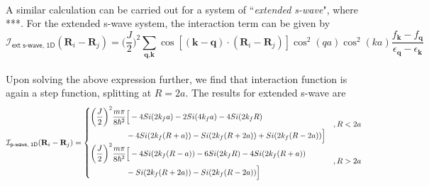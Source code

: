 \documentclass{article}
\begin{document}
\\
A similar calculation can be carried out for a system of ``\textit{extended s-wave}", where ***. For the extended s-wave system, the interaction term can be given by
\\
\begin{equation}
\mathcal{I}_{\textsf{ext s-wave, 1D}}(\textbf{R}_i - \textbf{R}_j)  =  \Bigg(\frac{J}{2}\Bigg)^2 \sum_{\textbf{q}, \textbf{k}} \cos[(\textbf{k}-\textbf{q})\cdot(\textbf{R}_i - \textbf{R}_j)] \cos^{2}(qa) \cos^{2}(ka) \frac{f_\textbf{k} - f_\textbf{q}}{\epsilon_\textbf{q} - \epsilon_\textbf{k} }
\end{equation}
\\
Upon solving the above expression further, we find that interaction function is again a step function, splitting at $R = 2a$. The results for extended s-wave are
\\
\begin{equation}
\mathcal{I}_{\textsf{p-wave, 1D}}(\textbf{R}_i - \textbf{R}_j) =
\begin{cases}
\centering
\begin{split}
\bigg(\frac{J}{2}\bigg)^2 \frac{m \pi}{8 \hbar^2} &\Big[ -4Si(2k_fa) -2Si(4k_fa) -4Si(2k_fR) \\ & -4Si(2k_f(R+a)) - Si(2k_f(R+2a)) +Si(2k_f(R-2a))\Big]
 \end{split}  & , R < 2a    \\

\begin{split}
\bigg(\frac{J}{2}\bigg)^2 \frac{m \pi}{8 \hbar^2} &\Big[ -4Si(2k_f(R-a)) -6Si(2k_fR) -4Si(2k_f(R+a)) \\ & - Si(2k_f(R+2a)) -Si(2k_f(R-2a))\Big]
\end{split}  & , R > 2a\\
\end{cases} 
\end{equation}
\end{document}
